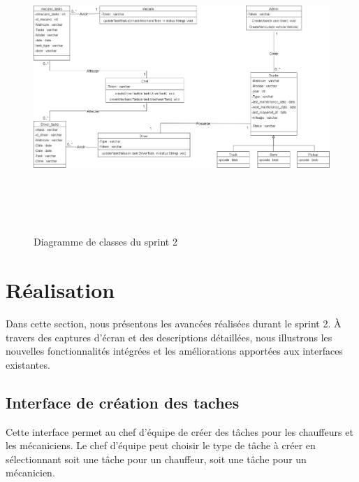 \begin{figure}[ht!]
  \centering
  \includegraphics[width=1.1\textwidth,height=11cm]{chap4.images/class sprint 2.png}
  \caption{Diagramme de classes du sprint 2}

\end{figure}

\newpage
\section{ Réalisation}

Dans cette section, nous présentons les avancées réalisées durant le sprint 2. À travers des captures d’écran et des descriptions détaillées, nous illustrons les nouvelles fonctionnalités intégrées et les améliorations apportées aux interfaces existantes.


\subsection{Interface de création des taches}

Cette interface permet au chef d'équipe de créer des tâches pour les chauffeurs et les mécaniciens. Le chef d'équipe peut choisir le type de tâche à créer en sélectionnant soit une tâche pour un chauffeur, soit une tâche pour un mécanicien.

